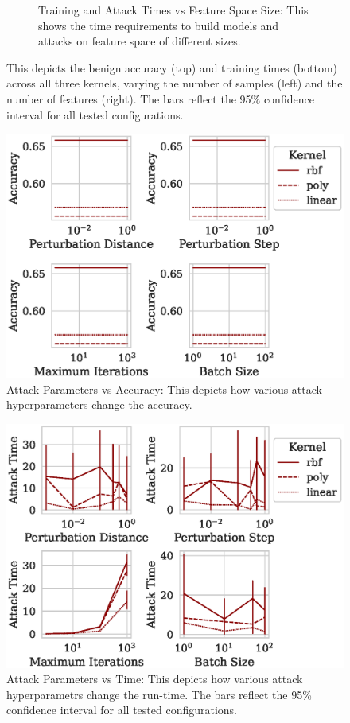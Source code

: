 \documentclass[fonts]{icst}
\begin{document}
\begin{figure}
\begin{subfigure}{.45\textwidth}
        \caption{Training and Attack Times vs Feature Space Size: This shows the time requirements to build models and attacks on feature space of different sizes.
        }
        \label{fig:features_time}
    \end{subfigure}
    \label{fig:model}
    \caption{This depicts the benign accuracy (top) and training times (bottom) across all three kernels, varying the number of samples (left) and the number of features (right).
The bars reflect the 95\% confidence interval for all tested configurations.}
\end{figure}

\begin{figure}[!htb]
  \centering
  \includegraphics[width=.75\textwidth]{./generated/accuracy_vs_attack_parameters.eps}
   \caption{Attack Parameters vs Accuracy: This depicts how various attack hyperparameters change the accuracy.
   }
   \label{fig:attack_accuracy}
\end{figure}


\begin{figure}
    \centering
    \includegraphics[width=.75\textwidth]{./generated/train_time_vs_attack_parameters.eps}
    \caption{Attack Parameters vs Time: This depicts how various attack hyperparametrs change the run-time.
The bars reflect the 95\% confidence interval for all tested configurations.}
    \label{fig:attack_time}
\end{figure}
\end{document}
